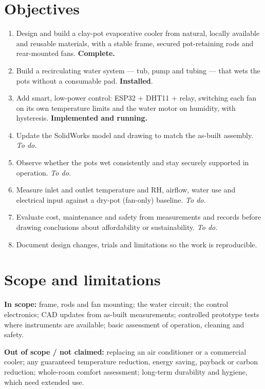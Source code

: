\documentclass[11pt,a4paper]{report}
\begin{document}
\section{Objectives}
\begin{enumerate}
\item Design and build a clay-pot evaporative cooler from natural, locally available and reusable materials, with a stable frame, secured pot-retaining rods and rear-mounted fans. \textcolor{cbok}{\textbf{Complete.}}
\item Build a recirculating water system --- tub, pump and tubing --- that wets the pots without a consumable pad. \textcolor{cbok}{\textbf{Installed}}.
\item Add smart, low-power control: ESP32 + DHT11 + relay, switching each fan on its own temperature limits and the water motor on humidity, with hysteresis. \textcolor{cbok}{\textbf{Implemented and running.}}
\item Update the SolidWorks model and drawing to match the as-built assembly. \emph{To do.}
\item Observe whether the pots wet consistently and stay securely supported in operation. \emph{To do.}
\item Measure inlet and outlet temperature and RH, airflow, water use and electrical input against a dry-pot (fan-only) baseline. \emph{To do.}
\item Evaluate cost, maintenance and safety from measurements and records before drawing conclusions about affordability or sustainability. \emph{To do.}
\item Document design changes, trials and limitations so the work is reproducible.
\end{enumerate}

\section{Scope and limitations}
\textbf{In scope:} frame, rods and fan mounting; the water circuit; the control electronics; CAD updates from as-built measurements; controlled prototype tests where instruments are available; basic assessment of operation, cleaning and safety.

\noindent\textbf{Out of scope / not claimed:} replacing an air conditioner or a commercial cooler; any guaranteed temperature reduction, energy saving, payback or carbon reduction; whole-room comfort assessment; long-term durability and hygiene, which need extended use.
\end{document}
